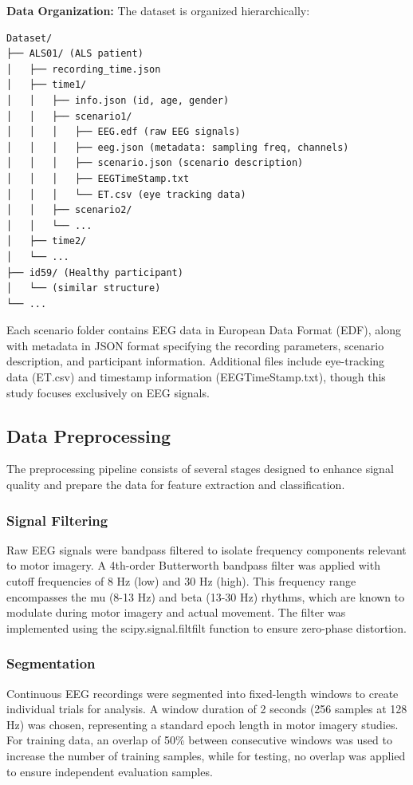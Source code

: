 \documentclass[conference]{IEEEtran}
\begin{document}
\textbf{Data Organization:}
The dataset is organized hierarchically:
\begin{verbatim}
Dataset/
├── ALS01/ (ALS patient)
│   ├── recording_time.json
│   ├── time1/
│   │   ├── info.json (id, age, gender)
│   │   ├── scenario1/
│   │   │   ├── EEG.edf (raw EEG signals)
│   │   │   ├── eeg.json (metadata: sampling freq, channels)
│   │   │   ├── scenario.json (scenario description)
│   │   │   ├── EEGTimeStamp.txt
│   │   │   └── ET.csv (eye tracking data)
│   │   ├── scenario2/
│   │   └── ...
│   ├── time2/
│   └── ...
├── id59/ (Healthy participant)
│   └── (similar structure)
└── ...
\end{verbatim}

Each scenario folder contains EEG data in European Data Format (EDF), along with metadata in JSON format specifying the recording parameters, scenario description, and participant information. Additional files include eye-tracking data (ET.csv) and timestamp information (EEGTimeStamp.txt), though this study focuses exclusively on EEG signals.

\subsection{Data Preprocessing}

The preprocessing pipeline consists of several stages designed to enhance signal quality and prepare the data for feature extraction and classification.

\subsubsection{Signal Filtering}
Raw EEG signals were bandpass filtered to isolate frequency components relevant to motor imagery. A 4th-order Butterworth bandpass filter was applied with cutoff frequencies of 8 Hz (low) and 30 Hz (high). This frequency range encompasses the mu (8-13 Hz) and beta (13-30 Hz) rhythms, which are known to modulate during motor imagery and actual movement. The filter was implemented using the scipy.signal.filtfilt function to ensure zero-phase distortion.

\subsubsection{Segmentation}
Continuous EEG recordings were segmented into fixed-length windows to create individual trials for analysis. A window duration of 2 seconds (256 samples at 128 Hz) was chosen, representing a standard epoch length in motor imagery studies. For training data, an overlap of 50\% between consecutive windows was used to increase the number of training samples, while for testing, no overlap was applied to ensure independent evaluation samples.
\end{document}

